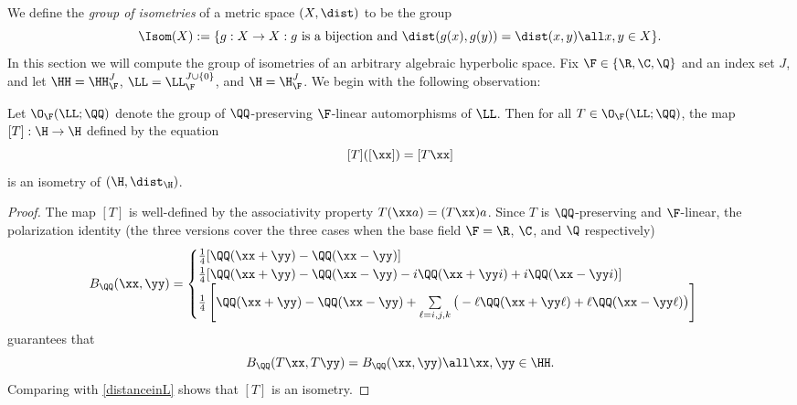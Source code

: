 We define the \emph{group of isometries} of a metric space $(X,\dist)$ to be the group
\[
\Isom(X) := \{g:X\to X: \text{$g$ is a bijection and } \dist(g(x),g(y)) = \dist(x,y)\all x,y\in X\}.
\]
In this section we will compute the group of isometries of an arbitrary algebraic hyperbolic space. Fix $\F\in\{\R,\C,\Q\}$ and an index set $J$, and let $\HH = \HH_\F^J$, $\LL = \LL_\F^{J\cup\{0\}}$, and $\H = \H_\F^J$. We begin with the following observation:

\begin{observation}
Let $\O_\F(\LL;\QQ)$ denote the group of $\QQ$-preserving $\F$-linear automorphisms of $\LL$. Then for all $T\in\O_\F(\LL;\QQ)$, the map $[T]:\H\to\H$ defined by the equation
\begin{equation}
\label{[T]def}
[T]([\xx]) = [T\xx]
\end{equation}
is an isometry of $(\H,\dist_\H)$.
\end{observation}
\begin{proof}
The map $[T]$ is well-defined by the associativity property $T(\xx a) = (T\xx) a$. Since $T$ is $\QQ$-preserving and $\F$-linear, the polarization identity (the three versions cover the three cases when the base field $\F = \R$, $\C$, and $\Q$ respectively)
\[
B_\QQ(\xx,\yy) = \begin{cases}
\frac 14 [\QQ(\xx + \yy) - \QQ(\xx - \yy)] \\
\frac 14 [\QQ(\xx + \yy) - \QQ(\xx - \yy) - i \QQ(\xx + \yy i) + i\QQ(\xx - \yy i)] \\
\frac 14 \left[\QQ(\xx + \yy) - \QQ(\xx - \yy) + \sum\limits_{\ell = i,j,k}\big( -\ell \QQ(\xx + \yy \ell) + \ell\QQ(\xx - \yy \ell) \big)\right] 
\end{cases}
\] 
guarantees that
\begin{equation}
\label{BQpreserving}
B_\QQ(T\xx,T\yy) = B_\QQ(\xx,\yy) \all \xx,\yy\in\HH.
\end{equation}
Comparing with \eqref{distanceinL} shows that $[T]$ is an isometry.
\end{proof}

